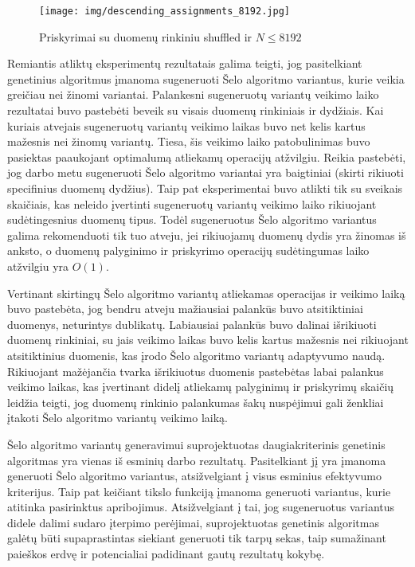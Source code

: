 \documentclass{VUMIFInfBakalaurinis}
\begin{document}
\begin{figure}[H]
  \centering
  \texttt{[image: img/descending\_assignments\_8192.jpg]}
  \caption{Priskyrimai su duomenų rinkiniu shuffled ir $N \leq 8192$}
  \label{img:descending_assignments_8192}
\end{figure}


Remiantis atliktų eksperimentų rezultatais galima teigti, jog
pasitelkiant genetinius algoritmus įmanoma sugeneruoti Šelo algoritmo variantus, kurie veikia greičiau nei žinomi variantai.
Palankesni sugeneruotų variantų veikimo laiko rezultatai buvo pastebėti beveik su visais duomenų rinkiniais ir dydžiais.
Kai kuriais atvejais sugeneruotų variantų veikimo laikas buvo net kelis kartus mažesnis nei žinomų variantų.
Tiesa, šis veikimo laiko patobulinimas buvo pasiektas paaukojant optimalumą atliekamų operacijų atžvilgiu.
Reikia pastebėti, jog darbo metu sugeneruoti Šelo algoritmo variantai yra baigtiniai (skirti rikiuoti specifinius duomenų dydžius).
Taip pat eksperimentai buvo atlikti tik su sveikais skaičiais, kas neleido įvertinti sugeneruotų variantų veikimo laiko rikiuojant sudėtingesnius duomenų tipus.
Todėl sugeneruotus Šelo algoritmo variantus galima rekomenduoti tik tuo atveju, jei rikiuojamų duomenų dydis yra žinomas iš anksto, o
duomenų palyginimo ir priskyrimo operacijų sudėtingumas laiko atžvilgiu yra $O(1)$.

Vertinant skirtingų Šelo algoritmo variantų atliekamas operacijas ir veikimo laiką buvo pastebėta, jog bendru atveju mažiausiai palankūs buvo
atsitiktiniai duomenys, neturintys dublikatų.
Labiausiai palankūs buvo dalinai išrikiuoti duomenų rinkiniai, su jais veikimo laikas buvo kelis kartus mažesnis nei rikiuojant atsitiktinius duomenis,
kas įrodo Šelo algoritmo variantų adaptyvumo naudą.
Rikiuojant mažėjančia tvarka išrikiuotus duomenis pastebėtas labai palankus veikimo laikas,
kas įvertinant didelį atliekamų palyginimų ir priskyrimų skaičių leidžia teigti,
jog duomenų rinkinio palankumas šakų nuspėjimui gali ženkliai įtakoti Šelo algoritmo variantų veikimo laiką.  

Šelo algoritmo variantų generavimui suprojektuotas daugiakriterinis genetinis algoritmas yra vienas iš esminių darbo rezultatų.
Pasitelkiant jį yra įmanoma generuoti Šelo algoritmo variantus, atsižvelgiant į visus esminius efektyvumo kriterijus.
Taip pat keičiant tikslo funkciją įmanoma generuoti variantus, kurie atitinka pasirinktus apribojimus.
Atsižvelgiant į tai, jog sugeneruotus variantus didele dalimi sudaro įterpimo perėjimai, suprojektuotas genetinis algoritmas
galėtų būti supaprastintas siekiant generuoti tik tarpų sekas, taip sumažinant paieškos erdvę ir potencialiai padidinant gautų rezultatų kokybę.
\end{document}
